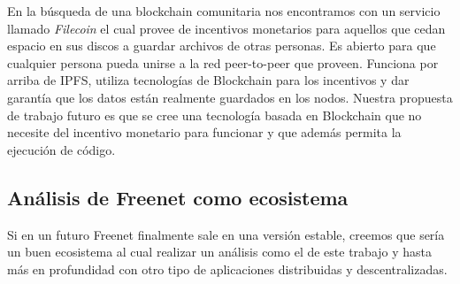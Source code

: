 En la búsqueda de una blockchain comunitaria nos encontramos con un servicio llamado \textit{Filecoin}\cite{filecoin} el cual provee de incentivos monetarios para aquellos que cedan espacio en sus discos a guardar archivos de otras personas. Es abierto para que cualquier persona pueda unirse a la red peer-to-peer que proveen. Funciona por arriba de IPFS, utiliza tecnologías de Blockchain para los incentivos y dar garantía que los datos están realmente guardados en los nodos. Nuestra propuesta de trabajo futuro es que se cree una tecnología basada en Blockchain que no necesite del incentivo monetario para funcionar y que además permita la ejecución de código.



\subsection{Análisis de Freenet como ecosistema}

Si en un futuro Freenet finalmente sale en una versión estable, creemos que sería un buen ecosistema al cual realizar un análisis como el de este trabajo y hasta más en profundidad con otro tipo de aplicaciones distribuidas y descentralizadas.